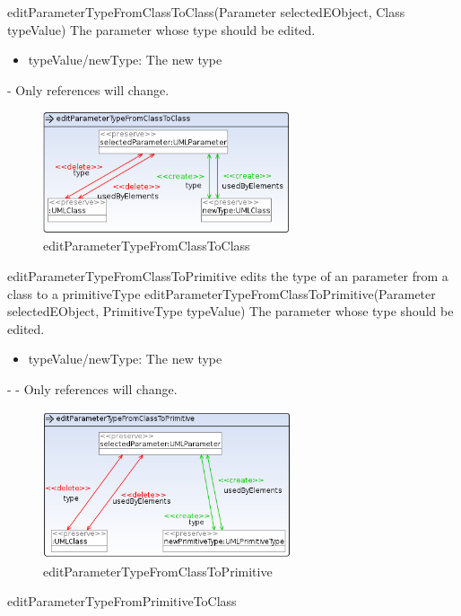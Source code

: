 {editParameterTypeFromClassToClass(Parameter selectedEObject, Class typeValue)}
{The parameter whose type should be edited.}
{
\begin{itemize}
 \item typeValue/newType: The new type
\end{itemize}
}
{-}
{Only references will change.}
\begin{figure}[H]
  \centering
  \includegraphics[width=0.65\textwidth]{pics/editParameterTypeFromClassToClass.png}
  \caption{editParameterTypeFromClassToClass}
  \label{editParameterTypeFromClassToClass}
\end{figure}
\op
{editParameterTypeFromClassToPrimitive}
{edits the type of an parameter from a class to a primitiveType}
{editParameterTypeFromClassToPrimitive(Parameter selectedEObject, PrimitiveType typeValue)}
{The parameter whose type should be edited.}
{
\begin{itemize}
 \item typeValue/newType: The new type
\end{itemize}
}
{-}
{-}
{Only references will change.}
\begin{figure}[H]
  \centering
  \includegraphics[width=0.65\textwidth]{pics/editParameterTypeFromClassToPrimitive.png}
  \caption{editParameterTypeFromClassToPrimitive}
  \label{editParameterTypeFromClassToPrimitive}
\end{figure}
\op
{editParameterTypeFromPrimitiveToClass}
